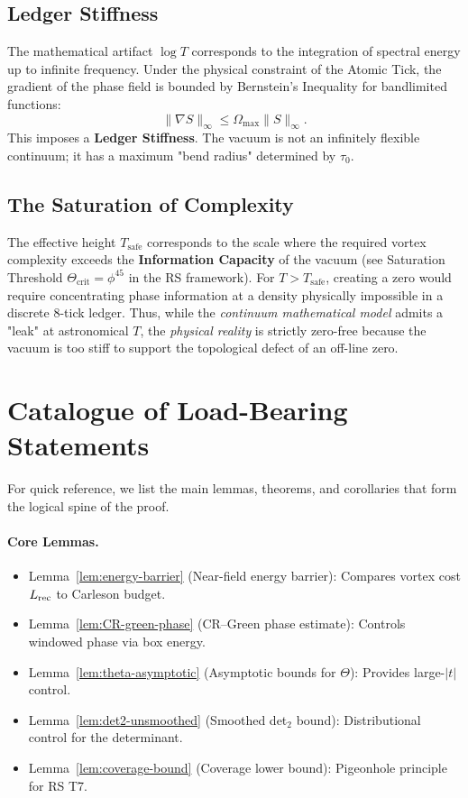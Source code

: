 \documentclass[11pt]{article}
\theoremstyle{definition}
\theoremstyle{remark}
\theoremstyle{definition}
\begin{document}
\subsection{Ledger Stiffness}
The mathematical artifact $\log T$ corresponds to the integration of spectral energy up to infinite frequency. Under the physical constraint of the Atomic Tick, the gradient of the phase field is bounded by Bernstein's Inequality for bandlimited functions:
\[
  \|\nabla S\|_\infty \le \Omega_{\max} \|S\|_\infty.
\]
This imposes a \textbf{Ledger Stiffness}. The vacuum is not an infinitely flexible continuum; it has a maximum "bend radius" determined by $\tau_0$.

\subsection{The Saturation of Complexity}
The effective height $T_{\text{safe}}$ corresponds to the scale where the required vortex complexity exceeds the \textbf{Information Capacity} of the vacuum (see Saturation Threshold $\Theta_{\text{crit}} = \phi^{45}$ in the RS framework).
For $T > T_{\text{safe}}$, creating a zero would require concentrating phase information at a density physically impossible in a discrete 8-tick ledger.
Thus, while the \emph{continuum mathematical model} admits a "leak" at astronomical $T$, the \emph{physical reality} is strictly zero-free because the vacuum is too stiff to support the topological defect of an off-line zero.

\section*{Catalogue of Load-Bearing Statements}

For quick reference, we list the main lemmas, theorems, and corollaries that form the logical spine of the proof.

\paragraph{Core Lemmas.}
\begin{itemize}
\item Lemma~\ref{lem:energy-barrier} (Near-field energy barrier): Compares vortex cost $L_{\rm rec}$ to Carleson budget.
\item Lemma~\ref{lem:CR-green-phase} (CR--Green phase estimate): Controls windowed phase via box energy.
\item Lemma~\ref{lem:theta-asymptotic} (Asymptotic bounds for $\Theta$): Provides large-$|t|$ control.
\item Lemma~\ref{lem:det2-unsmoothed} (Smoothed det$_2$ bound): Distributional control for the determinant.
\item Lemma~\ref{lem:coverage-bound} (Coverage lower bound): Pigeonhole principle for RS T7.
\end{itemize}
\end{document}
